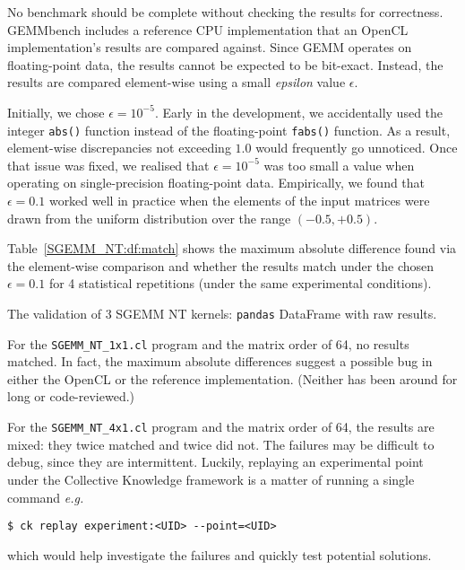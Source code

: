 \documentclass{acm_proc_article-sp} %
\begin{document}
No benchmark should be complete without checking the results for correctness.
%
GEMMbench includes a reference CPU implementation that an OpenCL
implementation's results are compared against.
%
Since GEMM operates on floating-point data, the results cannot be expected to be
bit-exact.
%
Instead, the results are compared element-wise using a small {\em epsilon}
value $\epsilon$.

Initially, we chose $\epsilon = 10^{-5}$.
%
Early in the development, we accidentally used the integer \verb|abs()|
function instead of the floating-point \verb|fabs()| function.
%
As a result, element-wise discrepancies not exceeding $1.0$ would frequently go
unnoticed.
%
Once that issue was fixed, we realised that $\epsilon = 10^{-5}$ was too small
a value when operating on single-precision floating-point data.
%
Empirically, we found that $\epsilon = 0.1$ worked well in practice when the
elements of the input matrices were drawn from the uniform distribution over
the range $(-0.5, +0.5)$.
%

Table~\ref{SGEMM_NT:df:match} shows the maximum absolute difference found via
the element-wise comparison and whether the results match under the chosen
$\epsilon = 0.1$ for 4 statistical repetitions (under the same experimental
conditions).

\begin{sidewaystable*}
  \centering
  \caption{\label{SGEMM_NT:df:match}The validation of 3 SGEMM NT kernels: {\tt pandas} DataFrame with raw results.}
  
\end{sidewaystable*}

For the \verb|SGEMM_NT_1x1.cl| program and the matrix order of 64, no results
matched.
%
In fact, the maximum absolute differences suggest a possible bug in either the
OpenCL or the reference implementation. (Neither has been around for long or
code-reviewed.)

For the \verb|SGEMM_NT_4x1.cl| program and the matrix order of 64, the results
are mixed: they twice matched and twice did not.
%
The failures may be difficult to debug, since they are intermittent.
%
Luckily, replaying an experimental point under the Collective Knowledge framework is
a matter of running a single command {\em e.g.}\:
%
\begin{verbatim}
$ ck replay experiment:<UID> --point=<UID>
\end{verbatim}
%
which would help investigate the failures and quickly test potential solutions.
\end{document}
